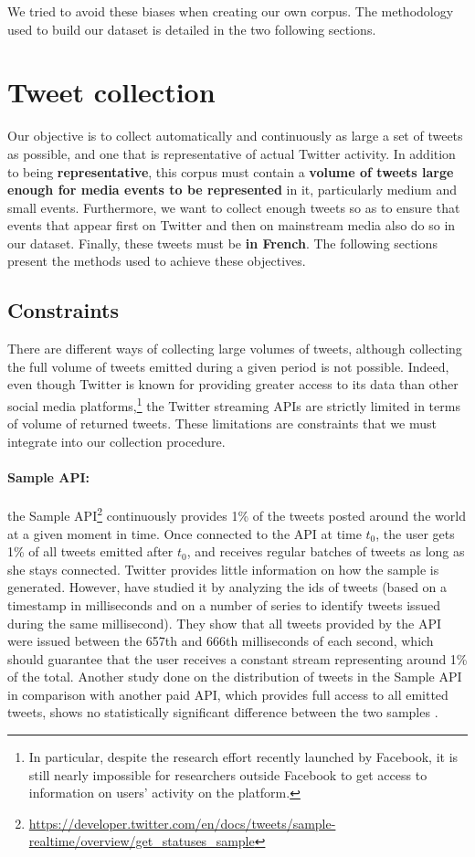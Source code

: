 We tried to avoid these biases when creating our own corpus. The methodology used to build our dataset is detailed in the two following sections.

\section{Tweet collection}
\label{Tweet collection}
Our objective is to collect automatically and continuously as large a set of tweets as possible, and one that is representative of actual Twitter activity. In addition to being \textbf{representative}, this corpus must contain a \textbf{volume of tweets large enough for media events to be represented} in it, particularly medium and small events.
Furthermore, we want to collect enough tweets so as to ensure that events that appear first on Twitter and then on
mainstream media also do so in our dataset. Finally, these tweets must be \textbf{in French}.
The following sections present the methods used to achieve these objectives.

\subsection{Constraints}
There are different ways of collecting large volumes of tweets, although collecting the full volume of tweets emitted during a given period is not possible. Indeed, even though Twitter is known for providing greater access to its data than other social media platforms,\footnote{In particular, despite the research effort recently launched by Facebook, it is still nearly impossible for researchers outside Facebook to get access to information on users' activity on the platform.} the Twitter streaming APIs are strictly limited in terms of volume of returned tweets. These limitations are constraints that we must integrate into our collection procedure.
	
	


\paragraph{Sample API:}

the Sample API\footnote{\url{https://developer.twitter.com/en/docs/tweets/sample-realtime/overview/get_statuses_sample}} continuously provides 1\% of the tweets posted around the world at a given moment in time. Once connected to the API at time $t_0$, the user gets 1\% of all tweets emitted after $t_0$, and receives regular batches of tweets as long as she stays connected. Twitter provides little information on how the sample is generated. However,  \citet{kergl_endogenesis_2014} have studied it by analyzing the ids of tweets (based on a timestamp in milliseconds and on a number of series to identify tweets issued during the same millisecond). They show that all tweets provided by the API were issued between the 657th and 666th milliseconds of each second, which should guarantee that the user receives a constant stream representing around 1\% of the total. Another study done on the distribution of tweets in the Sample API in comparison with another paid API, which provides full access to all emitted tweets, shows no statistically significant difference between the two samples \citep{morstatter_when_2014}.


